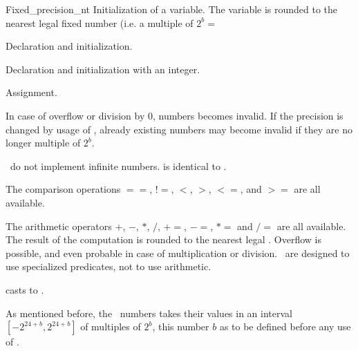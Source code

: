 \begin{ccRefClass}{Fixed_precision_nt}
            {Initialization of a variable. The variable is rounded to the
                nearest legal fixed number (i.e. a multiple of $2^b=$
                }


            {Declaration and initialization.}


            {Declaration and initialization with an integer.}

\ccOperations


        {Assignment. 
}

{In case of overflow or division by 0, numbers becomes invalid.
If the precision is changed by usage of 
, already existing numbers may become invalid
if they are no longer multiple of $2^b$.}

{ \ccClassName\ do not implement infinite numbers. 
   is identical to .}

The comparison operations $==$, $!=$, $<$, $>$, $<=$, and $>=$ are all
available.

The arithmetic operators $+$, $-$, $*$, $/$, $+=$, $-=$, $*=$ and $/=$
are all available. The result of the computation is rounded to the
nearest legal \ccClassName. Overflow is possible, and even probable in case
of multiplication or division. \ccClassName\ are designed to use
specialized predicates, not to use arithmetic.


         {casts to .}



As mentioned before, the \ccClassName\ numbers takes their values in an
interval $[-2^{24+b},2^{24+b}]$ of multiples of $2^b$,
this number $b$ as to be defined before any
 use of .


\end{ccRefClass}
